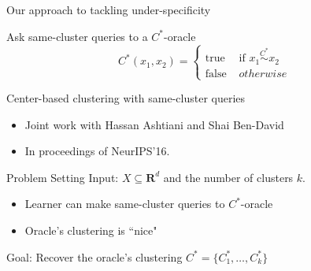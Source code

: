 \documentclass{beamer}
\newcommand{\mb}{\mathbf}
\begin{document}
\begin{frame}{Our approach to tackling under-specificity}
	

    \vspace{20pt}Ask {\color{blue}same-cluster queries} to a $C^*$-oracle\\
    $$C^*(x_1, x_2) = \left\{
	\begin{array}{ll}
		\mbox{true }  & \mbox{if } x_1 \overset{C^*}{\sim} x_2   \\
		\mbox{false } & otherwise 
	\end{array}
\right. $$
\end{frame}

\begin{frame}{Center-based clustering with same-cluster queries}
	\begin{itemize}
		\item Joint work with Hassan Ashtiani and Shai Ben-David
		\vspace{20pt} \item In proceedings of \alert{NeurIPS'16}.
	\end{itemize}
\end{frame}

\begin{frame}{Problem Setting}
	Input: $X \subseteq \mb R^d$ and the number of clusters $k$.
	\begin{itemize} 
   		\vspace{10pt}\item Learner can make same-cluster queries to $C^*$-oracle
		\vspace{10pt}\item Oracle's clustering is ``nice"
	\end{itemize}
	\vspace{30pt} {\color{blue}Goal}: Recover the oracle's clustering $C^* = \{C_1^*, \ldots, C_k^*\}$
\end{frame}
\end{document}
